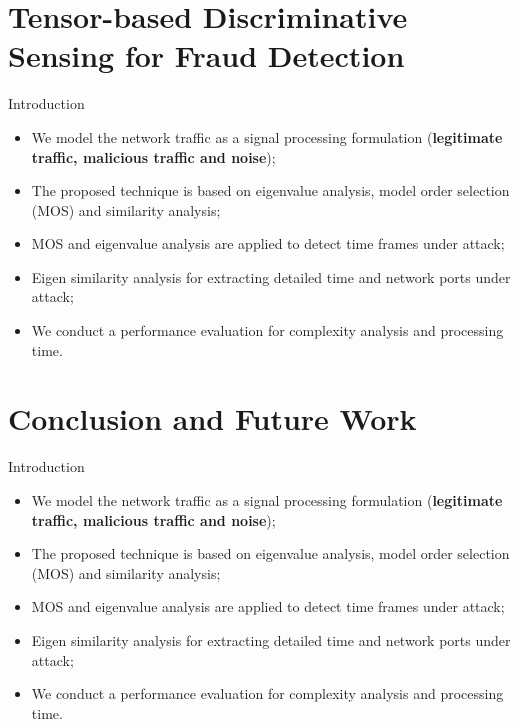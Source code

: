 \documentclass[newPxFont, numfooter, sectionpages]{beamer}
\begin{document}
%
%
\section{Tensor-based Discriminative Sensing for Fraud Detection}
\begin{frame}[c]{Introduction}
	\begin{itemize}
		\item We model the network traffic as a signal processing formulation (\textbf{legitimate traffic, malicious traffic and noise});
		\item The proposed technique is based on eigenvalue analysis, model order selection (MOS) and similarity analysis;
		\item MOS and eigenvalue analysis are applied to detect time frames under attack;
		\item Eigen similarity analysis for extracting detailed time and network ports under attack;
		\item We conduct a performance evaluation for complexity analysis and processing time.
	\end{itemize}
\end{frame}


%
%
\section{Conclusion and Future Work}
\begin{frame}[c]{Introduction}
	\begin{itemize}
		\item We model the network traffic as a signal processing formulation (\textbf{legitimate traffic, malicious traffic and noise});
		\item The proposed technique is based on eigenvalue analysis, model order selection (MOS) and similarity analysis;
		\item MOS and eigenvalue analysis are applied to detect time frames under attack;
		\item Eigen similarity analysis for extracting detailed time and network ports under attack;
		\item We conduct a performance evaluation for complexity analysis and processing time.
	\end{itemize}
\end{frame}
\end{document}
